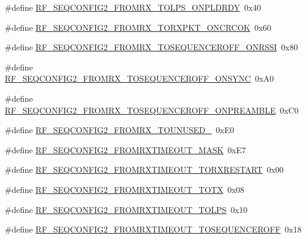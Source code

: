 \begin{DoxyCompactItemize}
\item 
\#define \mbox{\hyperlink{sx1276_regs-_fsk_8h_a39d97dcfbbf843fa3ed39b8684382fc2}{R\+F\+\_\+\+S\+E\+Q\+C\+O\+N\+F\+I\+G2\+\_\+\+F\+R\+O\+M\+R\+X\+\_\+\+T\+O\+L\+P\+S\+\_\+\+O\+N\+P\+L\+D\+R\+DY}}~0x40
\item 
\#define \mbox{\hyperlink{sx1276_regs-_fsk_8h_a15da62d2433f1464b5ed139af3bf2f43}{R\+F\+\_\+\+S\+E\+Q\+C\+O\+N\+F\+I\+G2\+\_\+\+F\+R\+O\+M\+R\+X\+\_\+\+T\+O\+R\+X\+P\+K\+T\+\_\+\+O\+N\+C\+R\+C\+OK}}~0x60
\item 
\#define \mbox{\hyperlink{sx1276_regs-_fsk_8h_a8da00c89f8cbc3168a1eef6440c76427}{R\+F\+\_\+\+S\+E\+Q\+C\+O\+N\+F\+I\+G2\+\_\+\+F\+R\+O\+M\+R\+X\+\_\+\+T\+O\+S\+E\+Q\+U\+E\+N\+C\+E\+R\+O\+F\+F\+\_\+\+O\+N\+R\+S\+SI}}~0x80
\item 
\#define \mbox{\hyperlink{sx1276_regs-_fsk_8h_a1d5b9abdda18dcf97144ee55420e9c63}{R\+F\+\_\+\+S\+E\+Q\+C\+O\+N\+F\+I\+G2\+\_\+\+F\+R\+O\+M\+R\+X\+\_\+\+T\+O\+S\+E\+Q\+U\+E\+N\+C\+E\+R\+O\+F\+F\+\_\+\+O\+N\+S\+Y\+NC}}~0x\+A0
\item 
\#define \mbox{\hyperlink{sx1276_regs-_fsk_8h_ad291c261a95d9171798bf2b564d1ac9c}{R\+F\+\_\+\+S\+E\+Q\+C\+O\+N\+F\+I\+G2\+\_\+\+F\+R\+O\+M\+R\+X\+\_\+\+T\+O\+S\+E\+Q\+U\+E\+N\+C\+E\+R\+O\+F\+F\+\_\+\+O\+N\+P\+R\+E\+A\+M\+B\+LE}}~0x\+C0
\item 
\#define \mbox{\hyperlink{sx1276_regs-_fsk_8h_a189edf62f7c74b86afb5d840272ed540}{R\+F\+\_\+\+S\+E\+Q\+C\+O\+N\+F\+I\+G2\+\_\+\+F\+R\+O\+M\+R\+X\+\_\+\+T\+O\+U\+N\+U\+S\+E\+D\+\_}}~0x\+E0
\item 
\#define \mbox{\hyperlink{sx1276_regs-_fsk_8h_a3d4b2324c35b3440327ddc622e57b54f}{R\+F\+\_\+\+S\+E\+Q\+C\+O\+N\+F\+I\+G2\+\_\+\+F\+R\+O\+M\+R\+X\+T\+I\+M\+E\+O\+U\+T\+\_\+\+M\+A\+SK}}~0x\+E7
\item 
\#define \mbox{\hyperlink{sx1276_regs-_fsk_8h_a61f477238d6ab34794c6beb2075f7c74}{R\+F\+\_\+\+S\+E\+Q\+C\+O\+N\+F\+I\+G2\+\_\+\+F\+R\+O\+M\+R\+X\+T\+I\+M\+E\+O\+U\+T\+\_\+\+T\+O\+R\+X\+R\+E\+S\+T\+A\+RT}}~0x00
\item 
\#define \mbox{\hyperlink{sx1276_regs-_fsk_8h_aafadf4e3c6d5afde4f45a52b150ac010}{R\+F\+\_\+\+S\+E\+Q\+C\+O\+N\+F\+I\+G2\+\_\+\+F\+R\+O\+M\+R\+X\+T\+I\+M\+E\+O\+U\+T\+\_\+\+T\+O\+TX}}~0x08
\item 
\#define \mbox{\hyperlink{sx1276_regs-_fsk_8h_a1e8856528e554ac06c0b15a0331af25f}{R\+F\+\_\+\+S\+E\+Q\+C\+O\+N\+F\+I\+G2\+\_\+\+F\+R\+O\+M\+R\+X\+T\+I\+M\+E\+O\+U\+T\+\_\+\+T\+O\+L\+PS}}~0x10
\item 
\#define \mbox{\hyperlink{sx1276_regs-_fsk_8h_ac8284b2e9e769af716e7e9e69d7489c3}{R\+F\+\_\+\+S\+E\+Q\+C\+O\+N\+F\+I\+G2\+\_\+\+F\+R\+O\+M\+R\+X\+T\+I\+M\+E\+O\+U\+T\+\_\+\+T\+O\+S\+E\+Q\+U\+E\+N\+C\+E\+R\+O\+FF}}~0x18

\end{DoxyCompactItemize}
